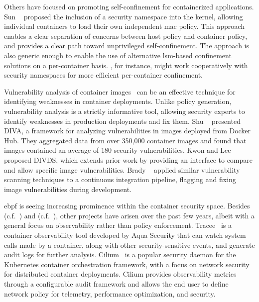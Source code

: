 Others have focused on promoting self-confinement for containerized applications. Sun
\etal~\cite{sun2018_security_namespace} proposed the inclusion of a security namespace
into the kernel, allowing individual containers to load their own independent \gls{mac}
policy. This approach enables a clear separation of concerns between host policy and
container policy, and provides a clear path toward unprivileged self-confinement. The
approach is also generic enough to enable the use of alternative \gls{lsm}-based
confinement solutions on a per-container basis. \bpfcontain{}, for instance, might work
cooperatively with security namespaces for more efficient per-container confinement.

Vulnerability analysis of container images~\cite{shu2017_image_vuln, kwon2020_divds,
brady2020_docker_cloud} can be an effective technique for identifying weaknesses in
container deployments. Unlike policy generation, vulnerability analysis is a strictly
informative tool, allowing security experts to identify weaknesses in production
deployments and fix them. Shu \etal~\cite{shu2017_image_vuln} presented DIVA, a framework
for analyzing vulnerabilities in images deployed from Docker Hub. They aggregated data
from over 350,000 container images and found that images contained an average of 180
security vulnerabilities. Kwon and Lee~\cite{kwon2020_divds} proposed DIVDS, which
extends prior work by providing an interface to compare and allow specific image
vulnerabilities.  Brady \etal~\cite{brady2020_docker_cloud} applied similar vulnerability
scanning techniques to a continuous integration pipeline, flagging and fixing image
vulnerabilities during development.

\gls{ebpf} is seeing increasing prominence within the container security space. Besides
\bpfbox{} (c.f.\ ) and \bpfcontain{} (c.f.\ ), other
projects have arisen over the past few years, albeit with a general focus on observability
rather than policy enforcement. Tracee~\cite{tracee} is a container observability tool
developed by Aqua Security that can watch system calls made by a container, along with
other security-sensitive events, and generate audit logs for further analysis.
Cilium~\cite{cilium} is a popular security daemon for the Kubernetes container
orchestration framework, with a focus on network security for distributed container
deployments. Cilium provides observability metrics through a configurable audit framework
and allows the end user to define network policy for telemetry, performance optimization,
and security.

